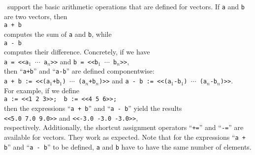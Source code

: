 \setlx\ support the basic arithmetic operations that are defined for vectors.  If \texttt{a} and
\texttt{b} are two vectors, then 
\\[0.2cm]
\hspace*{1.3cm}
\texttt{a + b}
\\[0.2cm]
computes the sum of \texttt{a} and \texttt{b}, while 
\\[0.2cm]
\hspace*{1.3cm}
\texttt{a - b}
\\[0.2cm]
computes their difference.  Concretely, if we have
\\[0.2cm]
\hspace*{1.3cm}
\texttt{a = <<a$_1$ $\cdots$ a$_n$>>} \quad and \quad
\texttt{b = <<b$_1$ $\cdots$ b$_n$>>},
\\[0.2cm]
then ``\texttt{a+b}'' and ``\texttt{a-b}'' are defined componentwise:
\\[0.2cm]
\hspace*{1.3cm}
\texttt{a + b := <<(a$_1$+b$_1$) $\cdots$ (a$_n$+b$_n$)>>} \quad and \quad
\texttt{a - b := <<(a$_1$-b$_1$) $\cdots$ (a$_n$-b$_n$)>>}.
\\[0.2cm]
For example, if we define
\\[0.2cm]
\hspace*{1.3cm}
\texttt{a := <<1 2 3>>; \ b := <<4 5 6>>;}
\\[0.2cm]
then the expressions ``\texttt{a + b}'' and ``\texttt{a - b}'' yield the results
\\[0.2cm]
\hspace*{1.3cm}
\texttt{<<5.0 7.0 9.0>>} \quad and \quad \texttt{<<-3.0 -3.0 -3.0>>},
\\[0.2cm]
respectively.  Additionally, the shortcut assignment operators ``\texttt{+=}'' and ``\texttt{-=}''
are available for vectors.  They work as expected.  Note that for the expressions ``\texttt{a + b}''
and ``\texttt{a - b}'' to be defined, \texttt{a} and \texttt{b} have to have the same number of
elements. 

